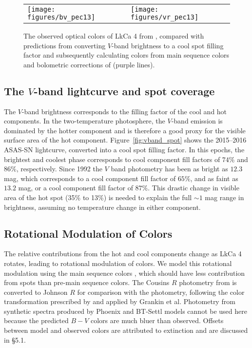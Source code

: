 \documentclass[twocolumn]{emulateapj}%
\begin{document}
\begin{figure*}
 \centering
 \begin{tabular}{ll}
 \texttt{[image: figures/bv\_pec13]} 
    &
   \texttt{[image: figures/vr\_pec13]}
    \end{tabular}
\caption{The observed optical colors of LkCa 4 from \citet{grankin08}, compared with predictions from converting $V$-band brightness to a cool spot filling factor and subsequently calculating colors from main sequence colors and bolometric corrections of \citet{kenyon95} (purple lines).}
\label{fig:colors}
\end{figure*}



\subsection{The $V$-band lightcurve and spot coverage}\label{sec:rotSpot1}

The  $V$-band brightness corresponds to the filling factor of the cool and hot components.  In the two-temperature photosphere, the $V$-band emission is dominated by the hotter component and is therefore a good proxy for the visible surface area of the hot component.  Figure~\ref{fig:vband_spot} shows the 2015--2016 ASAS-SN lightcurve, converted into a cool spot filling factor.  In this epochs, the brightest and coolest phase corresponds to cool component fill factors of $74\%$ and $86\%$, respectively.  Since 1992 the $V$ band photometry has been as bright as $12.3$ mag, which corresponds to a cool component fill factor of $65\%$, and as faint as $13.2$ mag, or a cool component fill factor of $87\%$.  This drastic change in visible area of the hot spot (35\% to 13\%) is needed to explain the full $\sim 1$ mag range in brightness, assuming no temperature change in either component.


\subsection{Rotational Modulation of Colors}\label{sec:rotSpot}

The relative contributions from the hot and cool components change as LkCa 4 rotates, leading to rotational modulation of colors.  We model this rotational modulation using the main sequence colors \citep[compiled by][]{pecaut13}, which should have less contribution from spots than  pre-main sequence colors.  The Cousins $R$ photometry from \citet{pecaut13} is converted to Johnson $R$ for comparison with the \citet{grankin08} photometry, following the color transformation prescribed by \citet{landolt83} and applied by Grankin et al.  Photometry from synthetic spectra produced by Phoenix and BT-Settl models cannot be used here because the predicted $B-V$ colors are much bluer than observed.  Offsets between model and observed colors are attributed to extinction and are discussed in \S 5.1.
\end{document}
